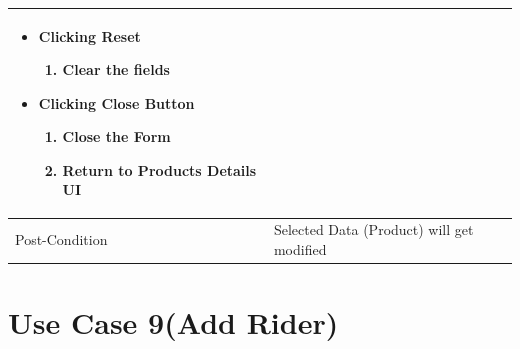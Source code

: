 \documentclass[12pt,a4paper]{report}
\begin{document}
\begin{tabular}{ | m{3cm} | m{12cm}| }
\begin{itemize}
\begin{enumerate}
	\end{enumerate}
\item Clicking Reset
	\begin{enumerate}
	   	 \item	Clear the fields
	\end{enumerate}
\item Clicking Close Button
	\begin{enumerate}
		\item Close the Form
		\item Return to Products Details UI
	\end{enumerate}
\end{itemize}
\\ \hline
Post-Condition &  Selected Data (Product) will get modified  \\ \hline

\end{tabular}
\section{Use Case 9(Add Rider)}
\end{document}
